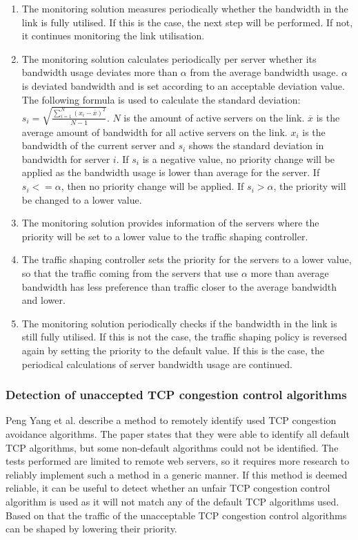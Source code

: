 \documentclass{article}
\begin{document}
\begin{enumerate}
	\item The monitoring solution measures periodically whether the bandwidth in the link is fully utilised. If this is the case, the next step will be performed. If not, it continues monitoring the link utilisation.
	\item The monitoring solution calculates periodically per server whether its bandwidth usage deviates more than $\alpha$ from the average bandwidth usage. $\alpha$ is deviated bandwidth and is set according to an acceptable deviation value. The following formula is used to calculate the standard deviation: $s_{i} = \sqrt{\frac{\sum_{i=1}^N (x_i - \overline{x})^2}{N-1} }$. $N$ is the amount of active servers on the link. $\overline{x}$ is the average amount of bandwidth for all active servers on the link. $x_i$ is the bandwidth of the current server and $s_{i}$ shows the standard deviation in bandwidth for server $i$. If $s_{i}$ is a negative value, no priority change will be applied as the bandwidth usage is lower than average for the server. If $s_{i} <= \alpha$, then no priority change will be applied. If $s_{i} > \alpha$, the priority will be changed to a lower value.
	\item The monitoring solution provides information of the servers where the priority will be set to a lower value to the traffic shaping controller.
	\item The traffic shaping controller sets the priority for the servers to a lower value, so that the traffic coming from the servers that use $\alpha$ more than average bandwidth has less preference than traffic closer to the average bandwidth and lower.
	\item The monitoring solution periodically checks if the bandwidth in the link is still fully utilised. If this is not the case, the traffic shaping policy is reversed again by setting the priority to the default value. If this is the case, the periodical calculations of server bandwidth usage are continued.
\end{enumerate}

\subsubsection{Detection of unaccepted TCP congestion control algorithms}

Peng Yang et al. describe a method to remotely identify used TCP congestion
avoidance algorithms\cite{tcp-congestion-identification}. The paper states that
they were able to identify all default TCP algorithms, but some non-default
algorithms could not be identified. The tests performed are limited to remote
web servers, so it requires more research to reliably implement such a method
in a generic manner. If this method is deemed reliable, it can be useful to
detect whether an unfair TCP congestion control algorithm is used as it will
not match any of the default TCP algorithms used. Based on that the traffic of
the unacceptable TCP congestion control algorithms can be shaped by lowering
their priority.
\end{document}
